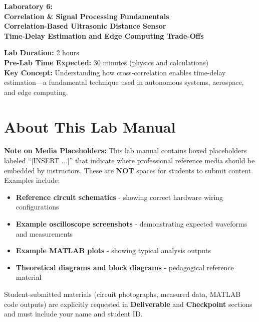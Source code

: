 \documentclass[11pt,letterpaper]{article}
\begin{document}
\begin{center}
\huge{\bf Laboratory 6:}\\
\vspace{0.2in}
\Large{\bf Correlation \& Signal Processing Fundamentals}\\
\Large{\bf Correlation-Based Ultrasonic Distance Sensor}\\
\vspace{0.2in}
\normalsize{\bf Time-Delay Estimation and Edge Computing Trade-Offs}
\end{center}

\vspace{0.3in}
\noindent
\textbf{Lab Duration:} 2 hours\\
\textbf{Pre-Lab Time Expected:} 30 minutes (physics and calculations)\\
\textbf{Key Concept:} Understanding how cross-correlation enables time-delay estimation—a fundamental technique used in autonomous systems, aerospace, and edge computing.

\tableofcontents
\clearpage

\section*{About This Lab Manual}

\textbf{Note on Media Placeholders:} This lab manual contains boxed placeholders labeled ``[INSERT ...]'' that indicate where professional reference media should be embedded by instructors. These are \textbf{NOT} spaces for students to submit content. Examples include:

\begin{itemize}
    \item \textbf{Reference circuit schematics} - showing correct hardware wiring configurations
    \item \textbf{Example oscilloscope screenshots} - demonstrating expected waveforms and measurements
    \item \textbf{Example MATLAB plots} - showing typical analysis outputs
    \item \textbf{Theoretical diagrams and block diagrams} - pedagogical reference material
\end{itemize}

\noindent Student-submitted materials (circuit photographs, measured data, MATLAB code outputs) are explicitly requested in \textbf{Deliverable} and \textbf{Checkpoint} sections and must include your name and student ID.
\end{document}
